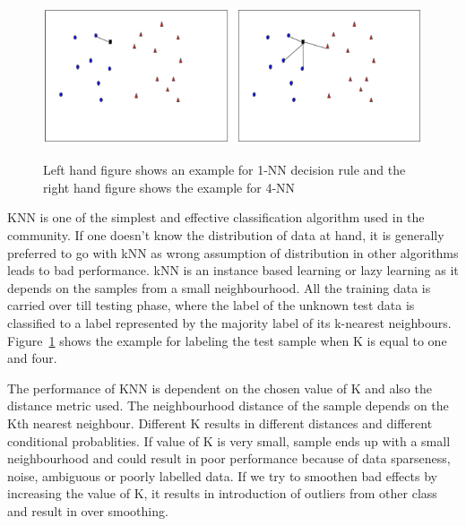
\begin{figure}
    \centering
    \includegraphics[width=5in, height=1.6in]{concepts/figures/knn.png}
    \label{fig:knn_example}
    \caption{Left hand figure shows an example for 1-NN decision rule and the right hand figure shows the example for 4-NN}
\end{figure}

KNN is one of the simplest and effective classification algorithm used in the community. 
If one doesn't know the distribution of data at hand, it is generally preferred to go 
with kNN as wrong assumption of distribution in other algorithms leads to bad performance.
kNN is an instance based learning or lazy learning as it depends on the samples from a 
small neighbourhood. All the training data is carried over till testing phase, where the 
label of the unknown test data is classified to a label represented by the majority label
of its k-nearest neighbours. Figure~\ref{fig:knn_example} shows the example for labeling the test sample when
K is equal to one and four.

The performance of KNN is dependent on the chosen value of K and also the distance metric
used. The neighbourhood distance of the sample depends on the Kth nearest neighbour. 
Different K results in different distances and different conditional probablities. If value
of K is very small, sample ends up with a small neighbourhood and could result in poor
performance because of data sparseness, noise, ambiguous or poorly labelled data. If we
try to smoothen bad effects by increasing the value of K, it results in introduction of 
outliers from other class and result in over smoothing.
